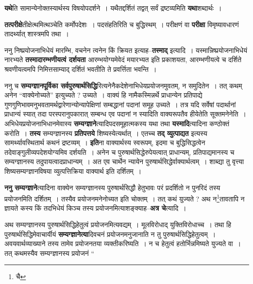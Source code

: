 \documentclass[article,12pt,a4paper]{memoir}
\begin{document}
	  \endgroup
	

	  \pstart \textbf{यथे}ति सामान्येनोक्तस्यार्थस्य विषयोपदर्शने । यथैतद्दर्शितं तद्वत् सर्वं द्रष्टव्यमिति \textbf{यथा}शब्दार्थः ।
	\pend
      

	  \pstart \textbf{तत्परीक्षे}तीक्षेत्थमित्थञ्चेति कर्मोपदेशः । पदसंहतिरिति च बुद्धिस्थम् । परीक्षणं वा \textbf{परीक्षा} विमृष्यावधारणं तादर्थ्यात् शास्त्रमपि तथा ।
	\pend
      

	  \pstart ननु निष्प्रयोजनाभिधेयं मारम्भि, वचनेन त्वनेन किं क्रियत इत्याह--\textbf{तस्माद्} इत्यादि । यस्मान्निष्प्रयोजनाभिधेयं नारभ्यते \textbf{तस्मादारम्भणीयत्वं दर्शयता} आरम्भयोग्यमेवेदं मयारभ्यत इति प्रकाशयता, आरम्भणीयत्वे च दर्शिते श्रवणीयत्वमपि निमित्तसाम्याद् दर्शितं भवतीति ते प्रवर्त्तिता भवन्ति ।
	\pend
      

	  \pstart ननु च \textbf{सम्यग्ज्ञानपूर्विका सर्वपुरुषार्थसिद्धि}रित्यनेनैकदेशेनाभिधेयप्रयोजनमुवतम्, न समुदितेन । तत् कथम् अनेन “वाक्येनोच्यते” इत्युच्यते ? उच्यते । वाक्यं हि नामैकस्मिन्नर्थे प्राधान्येन प्रतिपाद्ये गुणगुणिभावमनुभवतामर्थद्वारेणान्योन्यापेक्षिणां सम्बद्धानां पदानां समूह उच्यते । तत्र यदि सर्वेषां पदार्थानां प्राधान्यं स्यात् तदा परस्परानुपकारात् सम्बन्ध एव पदानां न स्यादिति वाक्यरूपतैव हीयेतेति सूक्तमनेनेति । अभिधेयप्रयोजनाभिधानमेवास्य \textbf{सम्यग्ज्ञाने}त्यादिपदसमूहात्मकस्य यथा तथा \textbf{यस्मादि}त्यादिना कण्ठोक्तं करोति । \textbf{तस्य} सम्यग्ज्ञानस्य \textbf{प्रतिपत्तये} शिष्यस्येत्यर्थात् । एतच्च \textbf{तद् व्युत्पाद्यत} इत्यस्य सामर्थ्यावस्थितार्थ कथनं द्रष्टव्यम् । \textbf{इति}ना वाक्यार्थस्य स्वरूपम्, इदमा च बुद्धिसिद्धत्वेन तदेवाङ्गुलीव्यपदेशयोग्यमिव दर्शयति । अनेन च पुरुषार्थसिद्धेरुपेयत्वात् प्राधान्यम्, प्रतिपाद्यमानस्य च सम्यग्ज्ञानस्य तदुपायत्वादप्राधान्यम् । अत एव चार्थेन न्यायेन पुरुषार्थसिद्धेर्वाक्यार्थत्वम् । शाब्द्या तु वृत्त्या शिष्यसम्यग्ज्ञानविषया व्युत्पत्तिक्रिया वाक्यार्थ इति दर्शितम् ।
	\pend
      

	  \pstart \textbf{ननु सम्यग्ज्ञाने}त्यादिना वाक्येन सम्यग्ज्ञानस्य पुरुषार्थसिद्धौ हेतुभावः परं प्रदर्शितो न पुनरिदं तस्य प्रयोजनमिति दर्शितम् । तस्यैव प्रयोजनमनेनोच्यत इति चोक्तम् । तत् कथं युज्यते ? अथ न\footnote{चै}तावतापि न ज्ञायते कस्य किं तदभिधेयं किञ्च तस्य प्रयोजनमित्याशङ्क्याह--\textbf{अत्र चे}त्यादि ।
	\pend
      

	  \pstart अथ सम्यग्ज्ञानस्य पुरुषार्थसिद्धिहेतुत्वं प्रयोजनमित्यवद्यम् । मूलविरोधाद् युक्तिविरोधाच्च । तथा हि पुरुषार्थसिद्धिमेवाचार्यीयं \textbf{सम्यग्ज्ञानेत्या}दिवचनं प्रयोजनमनुजानाति न तु पुरुषार्थसि\leavevmode{}द्धिहेतुत्वम् । अवयवार्थव्याख्याने तस्य तामेव प्रयोजनतया व्यक्तीकरिष्यति । न च हेतुत्वं हतोर्भिन्नमिष्यते युज्यते वा । तत् कथमस्यैव सम्यग्ज्ञानस्य प्रयोजनं  \leavevmode{} “
	  
\end{document}
